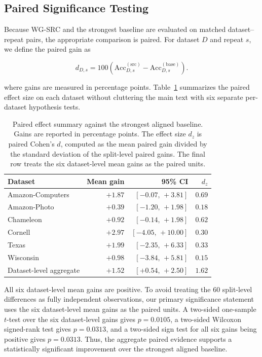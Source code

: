 \documentclass{article}
\newcommand{\SRC}{\textsc{WG-SRC}}
\begin{document}
\subsection{Paired Significance Testing}
\label{sec:paired-significance}

Because \SRC{} and the strongest baseline are evaluated on matched
dataset--repeat pairs, the appropriate comparison is paired. For dataset $D$
and repeat $s$, we define the paired gain as

\begin{equation}
d_{D,s}
=
100\left(
\mathrm{Acc}^{(\mathrm{src})}_{D,s}
-
\mathrm{Acc}^{(\mathrm{base})}_{D,s}
\right).
\label{eq:paired-gain}
\end{equation}


where gains are measured in percentage points. Table~\ref{tab:paired-effect}
summarizes the paired effect size on each dataset without cluttering the main
text with six separate per-dataset hypothesis tests.

\begin{table}[t]
\centering
\footnotesize
\caption{
Paired effect summary against the strongest aligned baseline. Gains are
reported in percentage points. The effect size $d_z$ is paired Cohen's $d$,
computed as the mean paired gain divided by the standard deviation of the
split-level paired gains. The final row treats the six dataset-level mean
gains as the paired units.
}
\label{tab:paired-effect}
\begin{tabular}{lrrr}
\toprule
Dataset & Mean gain & 95\% CI & $d_z$ \\
\midrule
Amazon-Computers & $+1.87$ & $[-0.07,\,+3.81]$ & $0.69$ \\
Amazon-Photo     & $+0.39$ & $[-1.20,\,+1.98]$ & $0.18$ \\
Chameleon        & $+0.92$ & $[-0.14,\,+1.98]$ & $0.62$ \\
Cornell          & $+2.97$ & $[-4.05,\,+10.00]$ & $0.30$ \\
Texas            & $+1.99$ & $[-2.35,\,+6.33]$ & $0.33$ \\
Wisconsin        & $+0.98$ & $[-3.84,\,+5.81]$ & $0.15$ \\
\midrule
Dataset-level aggregate & $+1.52$ & $[+0.54,\,+2.50]$ & $1.62$ \\
\bottomrule
\end{tabular}
\end{table}

All six dataset-level mean gains are positive. To avoid treating the 60
split-level differences as fully independent observations, our primary
significance statement uses the six dataset-level mean gains as the paired
units. A two-sided one-sample $t$-test over the six dataset-level gains gives
$p=0.0105$, a two-sided Wilcoxon signed-rank test gives $p=0.0313$, and a
two-sided sign test for all six gains being positive gives $p=0.0313$. Thus,
the aggregate paired evidence supports a statistically significant improvement
over the strongest aligned baseline. 
\end{document}
